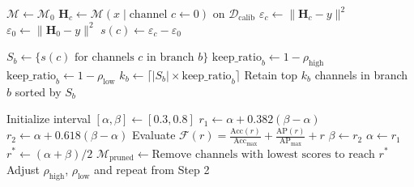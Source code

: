\documentclass{article}
\begin{document}
\begin{algorithm}[H]
\caption{Pose-Aware Channel Importance Pruning}
\label{alg:pose_aware_pruning}
\begin{algorithmic}[1]

\State $\mathcal{M} \gets \mathcal{M}_0$
\State {}
    \State $\mathbf{H}_c \gets \mathcal{M}(x \mid \text{channel } c \leftarrow 0)$ on $\mathcal{D}_{\text{calib}}$
    \State $\varepsilon_c \gets \| \mathbf{H}_c - y \|^2$
    \State $\varepsilon_0 \gets \| \mathbf{H}_0 - y \|^2$ 
    \State $s(c) \gets \varepsilon_c - \varepsilon_0$ 
\EndFor

\State {}
    \State $S_b \gets \{s(c) \text{ for channels } c \text{ in branch } b\}$
        \State $\text{keep\_ratio}_b \gets 1 - \rho_{\text{high}}$
    \Else
        \State $\text{keep\_ratio}_b \gets 1 - \rho_{\text{low}}$
    \EndIf
    \State $k_b \gets \lceil |S_b| \times \text{keep\_ratio}_b \rceil$
    \State Retain top $k_b$ channels in branch $b$ sorted by $S_b$
\EndFor

\State {}
\State Initialize interval $[\alpha, \beta] \gets [0.3, 0.8]$
\While{$\beta - \alpha > \epsilon$}
    \State $r_1 \gets \alpha + 0.382(\beta - \alpha)$
    \State $r_2 \gets \alpha + 0.618(\beta - \alpha)$
    \State Evaluate $\mathcal{F}(r) = \frac{\text{Acc}(r)}{\text{Acc}_{\max}} + \frac{\text{AP}(r)}{\text{AP}_{\max}} + r$
        \State $\beta \gets r_2$
    \Else
        \State $\alpha \gets r_1$
    \EndIf
\EndWhile
\State $r^* \gets (\alpha + \beta)/2$
\State $\mathcal{M}_{\text{pruned}} \gets \text{Remove channels with lowest scores to reach } r^*$
    \State Adjust $\rho_{\text{high}}$, $\rho_{\text{low}}$ and repeat from Step 2
\EndIf
\State {}
\end{algorithmic}
\end{algorithm}
\end{document}

